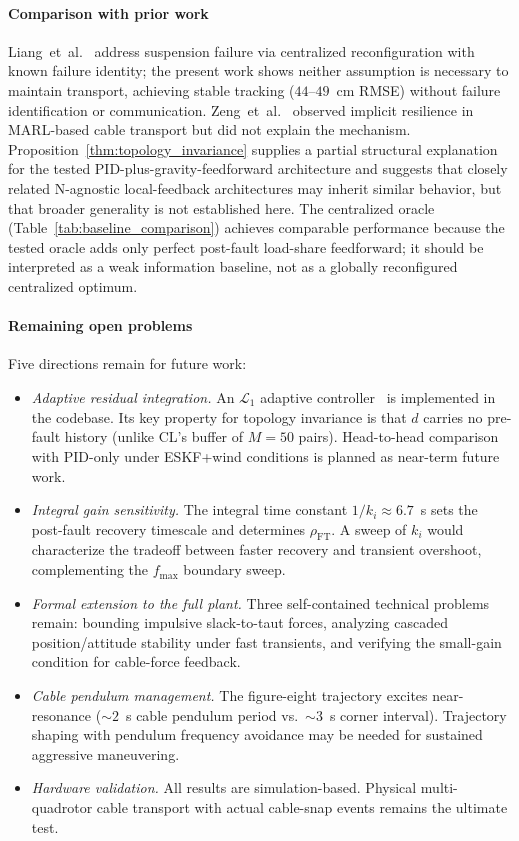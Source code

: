 \paragraph*{Comparison with prior work}
Liang~et~al.~\cite{liang2021fault} address suspension failure via centralized reconfiguration with known failure identity; the present work shows neither assumption is necessary to maintain transport, achieving stable tracking ($44$--$49$~cm RMSE) without failure identification or communication. Zeng~et~al.~\cite{zeng2025decentralized} observed implicit resilience in MARL-based cable transport but did not explain the mechanism. Proposition~\ref{thm:topology_invariance} supplies a partial structural explanation for the tested PID-plus-gravity-feedforward architecture and suggests that closely related N-agnostic local-feedback architectures may inherit similar behavior, but that broader generality is not established here. The centralized oracle (Table~\ref{tab:baseline_comparison}) achieves comparable performance because the tested oracle adds only perfect post-fault load-share feedforward; it should be interpreted as a weak information baseline, not as a globally reconfigured centralized optimum.

\paragraph*{Remaining open problems}
Five directions remain for future work:
%
\begin{itemize}
  \item \emph{Adaptive residual integration.} An $\mathcal{L}_1$ adaptive controller~\cite{cao2010l1book,cao2010stability} is implemented in the codebase. Its key property for topology invariance is that $\hat{d}$ carries no pre-fault history (unlike CL's buffer of $M{=}50$ pairs). Head-to-head comparison with PID-only under ESKF+wind conditions is planned as near-term future work.
  \item \emph{Integral gain sensitivity.} The integral time constant $1/k_i \approx 6.7$~s sets the post-fault recovery timescale and determines $\rho_{\mathrm{FT}}$. A sweep of $k_i$ would characterize the tradeoff between faster recovery and transient overshoot, complementing the $f_{\max}$ boundary sweep.
  \item \emph{Formal extension to the full plant.} Three self-contained technical problems remain: bounding impulsive slack-to-taut forces, analyzing cascaded position/attitude stability under fast transients, and verifying the small-gain condition for cable-force feedback.
  \item \emph{Cable pendulum management.} The figure-eight trajectory excites near-resonance (${\sim}2$~s cable pendulum period vs.\ ${\sim}3$~s corner interval). Trajectory shaping with pendulum frequency avoidance may be needed for sustained aggressive maneuvering.
  \item \emph{Hardware validation.} All results are simulation-based. Physical multi-quadrotor cable transport with actual cable-snap events remains the ultimate test.
\end{itemize}
